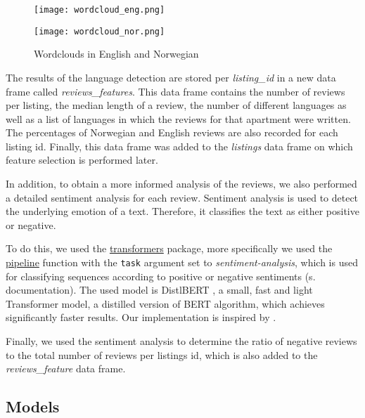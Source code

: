 \begin{figure}[t]
  \centering
  \begin{minipage}{6.7cm}
    \texttt{[image: wordcloud\_eng.png]}
  \end{minipage}
  \begin{minipage}{6.7cm}
    \texttt{[image: wordcloud\_nor.png]}
  \end{minipage}
  \caption{Wordclouds in English and Norwegian}
  \label{fig:wordclouds}
\end{figure}

The results of the language detection are stored per \textit{listing\_id} in a new data frame called \textit{reviews\_features}.
This data frame contains the number of reviews per listing, the median length of a review, the number of different languages as well as a list of languages in which the reviews for that apartment were written.
The percentages of Norwegian and English reviews are also recorded for each listing id.
Finally, this data frame was added to the \textit{listings} data frame on which feature selection is performed later.

In addition, to obtain a more informed analysis of the reviews, we also performed a detailed sentiment analysis for each review.
Sentiment analysis is used to detect the underlying emotion of a text.
Therefore, it classifies the text as either positive or negative.

To do this, we used the \href{https://huggingface.co/transformers/v3.0.2/model_doc/distilbert.html}{transformers} package, more specifically we used the \href{https://huggingface.co/transformers/v3.0.2/main_classes/pipelines.html}{pipeline} function with the \texttt{task} argument set to \textit{sentiment-analysis}, which is used for classifying sequences according to positive or negative sentiments (s. documentation).
The used model is DistlBERT \citep{sanh2020}, a small, fast and light Transformer model, a distilled version of BERT \citep{devlin2019} algorithm, which achieves significantly faster results.
Our implementation is inspired by \citep{selvaraj2020}.

Finally, we used the sentiment analysis to determine the ratio of negative reviews to the total number of reviews per listings id, which is also added to the \textit{reviews\_feature} data frame.

\subsection{Models}

